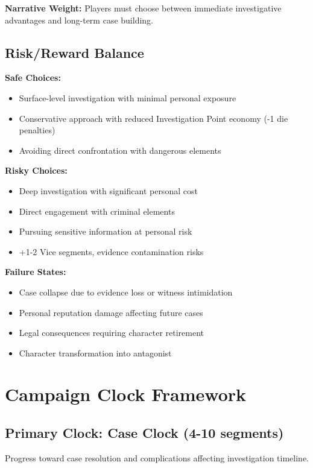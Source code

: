 \documentclass[11pt]{article}
\begin{document}
\textbf{Narrative Weight:} Players must choose between immediate investigative advantages and long-term case building.

\subsection{Risk/Reward Balance}

\textbf{Safe Choices:}
\begin{itemize}
\item Surface-level investigation with minimal personal exposure
\item Conservative approach with reduced Investigation Point economy (-1 die penalties)
\item Avoiding direct confrontation with dangerous elements
\end{itemize}

\textbf{Risky Choices:}
\begin{itemize}
\item Deep investigation with significant personal cost
\item Direct engagement with criminal elements
\item Pursuing sensitive information at personal risk
\item +1-2 Vice segments, evidence contamination risks
\end{itemize}

\textbf{Failure States:}
\begin{itemize}
\item Case collapse due to evidence loss or witness intimidation
\item Personal reputation damage affecting future cases
\item Legal consequences requiring character retirement
\item Character transformation into antagonist
\end{itemize}

\section{Campaign Clock Framework}

\subsection{Primary Clock: Case Clock (4-10 segments)}

Progress toward case resolution and complications affecting investigation timeline.
\end{document}
